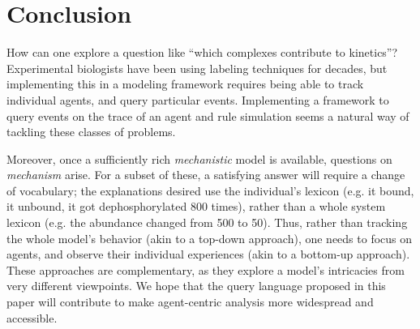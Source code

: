 \section{Conclusion}

How can one explore a question like ``which complexes contribute to
kinetics''? Experimental biologists have been using labeling
techniques for decades, but implementing this in a modeling framework
requires being able to track individual agents, and query particular
events. Implementing a framework to query events on the trace of an
agent and rule simulation seems a natural way of tackling these
classes of problems.

Moreover, once a sufficiently rich
\emph{mechanistic} model is available, questions on \emph{mechanism}
arise. For a subset of these, a satisfying answer will require a
change of vocabulary; the explanations desired use the individual's
lexicon (e.g. it bound, it unbound, it got dephosphorylated 800
times), rather than a whole system lexicon (e.g. the abundance changed
from 500 to 50). Thus, rather than tracking the whole model's behavior
(akin to a top-down approach), one needs to focus on agents, and
observe their individual experiences (akin to a bottom-up
approach). These approaches are complementary, as they explore a
model's intricacies from very different viewpoints. We hope that the
query language proposed in this paper will contribute to make
agent-centric analysis more widespread and accessible.
